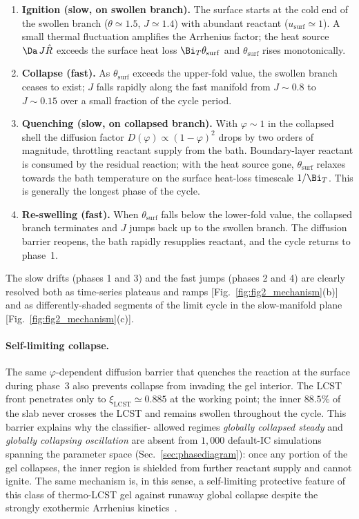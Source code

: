 \begin{enumerate}[leftmargin=*,label=\arabic*.]
\item \textbf{Ignition (slow, on swollen branch).}  The surface starts
  at the cold end of the swollen branch ($\theta\!\simeq\!1.5$,
  $J\!\simeq\!1.4$) with abundant reactant
  ($u_\mathrm{surf}\!\simeq\!1$).  A small thermal fluctuation
  amplifies the Arrhenius factor; the heat source $\Da\,J\hat R$
  exceeds the surface heat loss $\Bi_T\theta_\mathrm{surf}$ and
  $\theta_\mathrm{surf}$ rises monotonically.
\item \textbf{Collapse (fast).}  As $\theta_\mathrm{surf}$ exceeds the
  upper-fold value, the swollen branch ceases to exist; $J$ falls
  rapidly along the fast manifold from $J\!\sim\!0.8$ to
  $J\!\sim\!0.15$ over a small fraction of the cycle period.
\item \textbf{Quenching (slow, on collapsed branch).}  With
  $\varphi\!\sim\!1$ in the collapsed shell the diffusion factor
  $D(\varphi) \propto (1-\varphi)^2$ drops by two orders of magnitude,
  throttling reactant supply from the bath.  Boundary-layer reactant
  is consumed by the residual reaction; with the heat source gone,
  $\theta_\mathrm{surf}$ relaxes towards the bath temperature on the
  surface heat-loss timescale $1/\Bi_T$.  This is generally the
  longest phase of the cycle.
\item \textbf{Re-swelling (fast).}  When $\theta_\mathrm{surf}$ falls
  below the lower-fold value, the collapsed branch terminates and $J$
  jumps back up to the swollen branch.  The diffusion barrier
  reopens, the bath rapidly resupplies reactant, and the cycle
  returns to phase~1.
\end{enumerate}

The slow drifts (phases 1 and 3) and the fast jumps (phases 2 and 4)
are clearly resolved both as time-series plateaus and ramps
[Fig.~\ref{fig:fig2_mechanism}(b)] and as differently-shaded
segments of the limit cycle in the slow-manifold plane
[Fig.~\ref{fig:fig2_mechanism}(c)].

\paragraph{Self-limiting collapse.}  The same $\varphi$-dependent
diffusion barrier that quenches the reaction at the surface during
phase~3 also prevents collapse from invading the gel interior.  The
LCST front penetrates only to
$\xi_\mathrm{LCST}\!\simeq\!0.885$ at the working point; the inner
$88.5\%$ of the slab never crosses the LCST and remains swollen
throughout the cycle.  This barrier explains why the classifier-
allowed regimes \emph{globally collapsed steady} and \emph{globally
collapsing oscillation} are absent from $1{,}000$ default-IC
simulations spanning the parameter space (Sec.~\ref{sec:phasediagram}):
once any portion of the gel collapses, the inner region is shielded
from further reactant supply and cannot ignite. The same mechanism
is, in this sense, a self-limiting protective feature of this class
of thermo-LCST gel against runaway global collapse despite the
strongly exothermic Arrhenius
kinetics~\cite{FrankKamenetskii1969,Uppal1974}.

